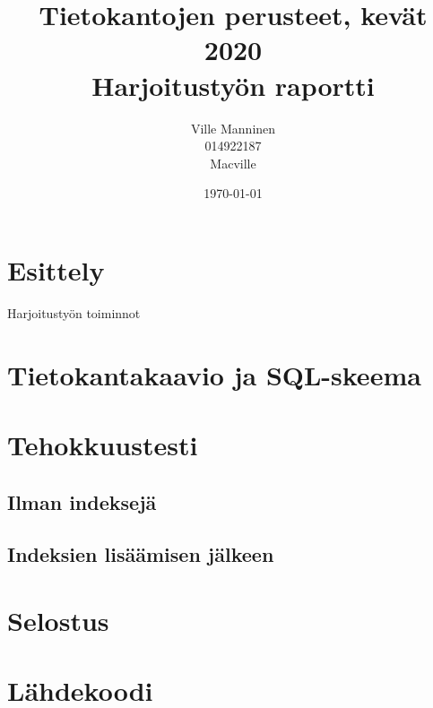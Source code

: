\documentclass[10pt,a4paper]{article}
\begin{document}
\title{Tietokantojen perusteet, kevät 2020 \\
Harjoitustyön raportti}
\author{Ville Manninen \\ 014922187 \\ Macville}
\date{\today}
\maketitle \quad

\section{Esittely}
Harjoitustyön toiminnot

\section{Tietokantakaavio ja SQL-skeema}

\section{Tehokkuustesti}
\subsection*{Ilman indeksejä}
\subsection*{Indeksien lisäämisen jälkeen}

\section{Selostus}


\section{Lähdekoodi}
\end{document}
